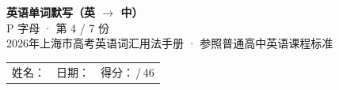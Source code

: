 \documentclass[10pt,a4paper]{article}
\begin{document}
\pagestyle{plain}

\begin{center}
{\LARGE\bfseries 英语单词默写（英 $\to$ 中）}\\[0.22em]
{\large P 字母 · 第 4 / 7 份}\\[0.18em]
{\small 2026年上海市高考英语词汇用法手册 · 参照普通高中英语课程标准}
\end{center}

\vspace{0.25em}
\noindent\begin{tabular}{@{}p{}@{}p{}@{}p{}@{}}
姓名：\underline{\hspace{2.0cm}} & 日期：\underline{\hspace{2.0cm}} & 得分：\underline{\hspace{1.3cm}}\,/\,46 \\
\end{tabular}

\vspace{0.3em}

\vspace{0.08em}
\end{document}
